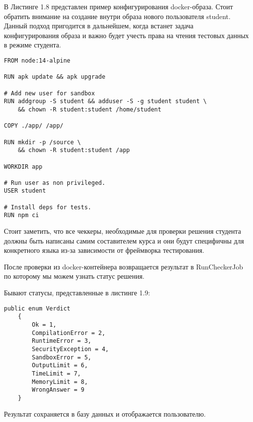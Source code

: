 В Листинге 1.8 представлен пример конфигурирования docker-образа. 
Стоит обратить внимание на создание внутри образа нового пользователя student. Данный подход пригодится в дальнейшем, когда встанет задача конфигурирования образа и важно будет учесть права на чтения тестовых данных в режиме студента. 
\begin{lstlisting}[caption={Dockerfile для проверки задач по курсу JavaScript}]
FROM node:14-alpine

RUN apk update && apk upgrade

# Add new user for sandbox
RUN addgroup -S student && adduser -S -g student student \
    && chown -R student:student /home/student

COPY ./app/ /app/

RUN mkdir -p /source \
    && chown -R student:student /app

WORKDIR app

# Run user as non privileged.
USER student

# Install deps for tests.
RUN npm ci
\end{lstlisting}

Стоит заметить, что все чеккеры, необходимые для проверки решения студента должны быть написаны самим составителем курса и они будут специфичны для конкретного языка из-за зависимости от фреймворка тестирования.

После проверки из docker-контейнера возвращается результат в RunCheckerJob по которому мы можем узнать статус решения.

Бывают статусы, представленные в листинге 1.9:

\begin{lstlisting}[caption={Модель описывающая статус решения}]
public enum Verdict
	{
		Ok = 1,
		CompilationError = 2,
		RuntimeError = 3,
		SecurityException = 4,
		SandboxError = 5,
		OutputLimit = 6,
		TimeLimit = 7,
		MemoryLimit = 8,
		WrongAnswer = 9
	}
\end{lstlisting}

Результат сохраняется в базу данных и отображается пользователю.			
			

